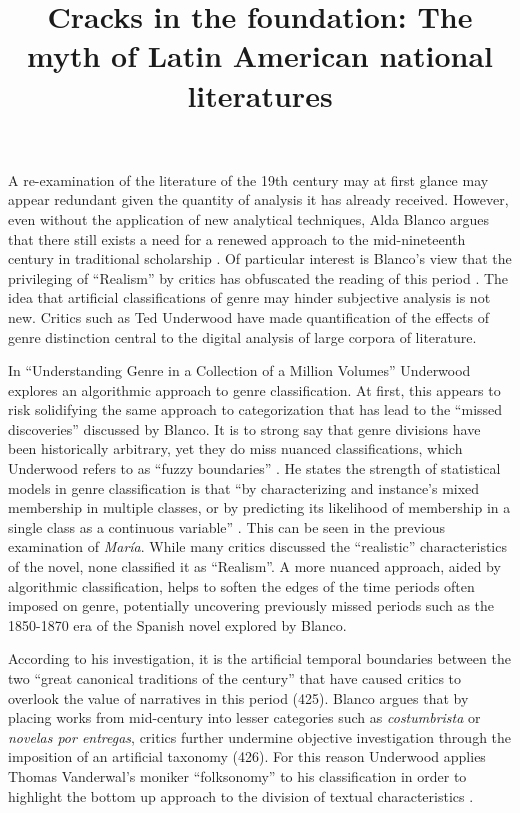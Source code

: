 \documentclass[12pt]{report}
\title{Cracks in the foundation: The myth of Latin American national literatures}
\begin{document}

A re-examination of the literature of the 19th century may at first glance may appear redundant given the quantity of analysis it has already received. 
However, even without the application of new analytical techniques, Alda Blanco argues that there still exists a need for a renewed approach to the mid-nineteenth century in traditional scholarship \cite[423]{Blanco2000}.
Of particular interest is Blanco's view that the privileging of \enquote{Realism} by critics has obfuscated the reading of this period \cite[433]{Blanco2000}.
The idea that artificial classifications of genre may hinder subjective analysis is not new.
Critics such as Ted Underwood have made quantification of the effects of genre distinction central to the digital analysis of large corpora of literature. 

In \enquote{Understanding Genre in a Collection of a Million Volumes} Underwood explores an algorithmic approach to genre classification. 
At first, this appears to risk solidifying the same approach to categorization that has lead to the \enquote{missed discoveries} discussed by Blanco.
It is to strong say that genre divisions have been historically arbitrary, yet they do miss nuanced classifications, which Underwood refers to as \enquote{fuzzy boundaries} \cite[9]{Underwood2014}.
He states the strength of statistical models in genre classification is that \enquote{by characterizing and instance's mixed membership in multiple classes, or by predicting its likelihood of membership in a single class as a continuous variable} \cite[9]{Underwood2014}.
This can be seen in the previous examination of \textit{María}.
While many critics discussed the \enquote{realistic} characteristics of the novel, none classified it as \enquote{Realism}.
A more nuanced approach, aided by algorithmic classification, helps to soften the edges of the time periods often imposed on genre, potentially uncovering previously missed periods such as the 1850-1870 era of the Spanish novel explored by Blanco.

According to his investigation, it is the artificial temporal boundaries between the two \enquote{great canonical traditions of the century} that have caused critics to overlook the value of narratives in this period (425)\nocite{Blanco2000}.
Blanco argues that by placing works from mid-century into lesser categories such as \textit{costumbrista} or \textit{novelas por entregas}, critics further undermine objective investigation through the imposition of an artificial taxonomy (426)\nocite{Blanco2000}.
For this reason Underwood applies Thomas Vanderwal's moniker \enquote{folksonomy} to his classification in order to highlight the bottom up approach to the division of textual characteristics \cite{Underwood2014, Vanderwal2007}.
\end{document}
